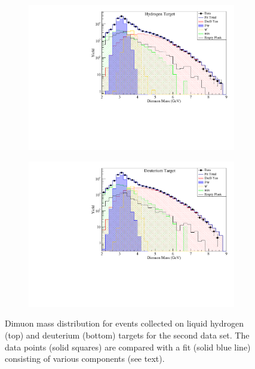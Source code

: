 \documentclass[reprint,aps,unsortedaddress,superscriptaddress,prd,floatfix,showpacs,linenumbers]{revtex4-2}
\begin{document}
\begin{figure}[htbp!]
	\centering
	\begin{subfigure}{\linewidth}
		\includegraphics[width=\linewidth]{massfit_run56_LH2.pdf}
	\end{subfigure}
	\begin{subfigure}{\linewidth}
		\includegraphics[width=\linewidth]{massfit_run56_LD2.pdf}
	\end{subfigure}
	\caption{Dimuon mass distribution for events collected
	on liquid hydrogen (top) and deuterium (bottom) targets for the second data set.
	The data points (solid squares) are compared with a fit (solid blue line) consisting of
	various components (see text).}
	\label{fig:massfit}
\end{figure}
\end{document}
